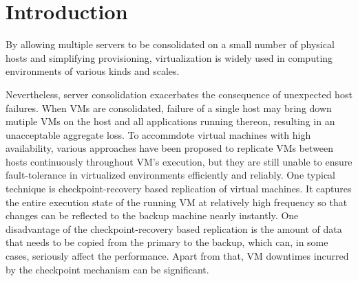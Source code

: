 \section{Introduction} \label{sec:intro}

By allowing multiple servers to be consolidated on a small number of physical hosts 
and simplifying provisioning, virtualization is widely used in computing environments 
of various kinds and scales.

Nevertheless, server consolidation exacerbates the consequence of unexpected host failures. 
When VMs are consolidated, failure of a single host may bring down mutiple VMs on the host 
and all applications running thereon, resulting in an unacceptable aggregate loss. 
To accommdote virtual machines with high availability, various approaches have been 
proposed to replicate VMs between hosts continuously throughout VM's execution, but 
they are still unable to ensure fault-tolerance in virtualized environments efficiently 
and reliably. One typical technique is checkpoint-recovery based replication of virtual 
machines. It captures the entire execution state of the running VM at relatively 
high frequency so that changes can be reflected to the backup machine nearly instantly. 
One disadvantage of the checkpoint-recovery based replication is the amount of data that 
needs to be copied from the primary to the backup, which can, in some cases, seriously 
affect the performance. Apart from that, VM downtimes incurred by the checkpoint mechanism 
can be significant.




